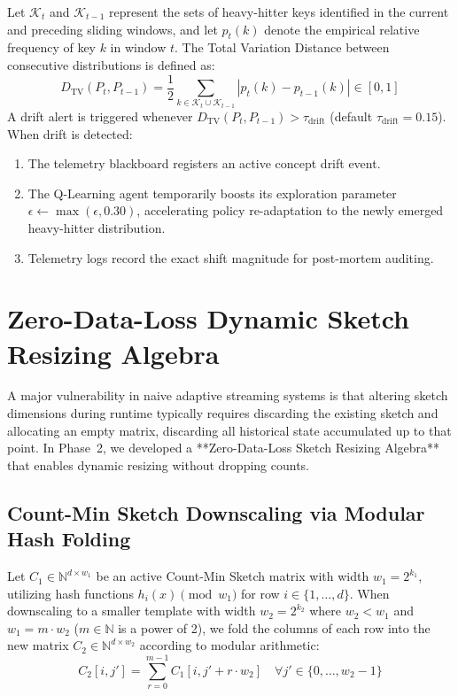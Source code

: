 Let $\mathcal{K}_t$ and $\mathcal{K}_{t-1}$ represent the sets of heavy-hitter keys identified in the current and preceding sliding windows, and let $p_t(k)$ denote the empirical relative frequency of key $k$ in window $t$. The Total Variation Distance between consecutive distributions is defined as:
\begin{equation}
    D_{\text{TV}}(P_t, P_{t-1}) = \frac{1}{2} \sum_{k \in \mathcal{K}_t \cup \mathcal{K}_{t-1}} |p_t(k) - p_{t-1}(k)| \in [0, 1]
    \label{eq:drift_formula}
\end{equation}
A drift alert is triggered whenever $D_{\text{TV}}(P_t, P_{t-1}) > \tau_{\text{drift}}$ (default $\tau_{\text{drift}} = 0.15$). When drift is detected:
\begin{enumerate}
 \item The telemetry blackboard registers an active concept drift event.
 \item The Q-Learning agent temporarily boosts its exploration parameter $\epsilon \leftarrow \max(\epsilon, 0.30)$, accelerating policy re-adaptation to the newly emerged heavy-hitter distribution.
 \item Telemetry logs record the exact shift magnitude for post-mortem auditing.
\end{enumerate}

\section{Zero-Data-Loss Dynamic Sketch Resizing Algebra}

A major vulnerability in naive adaptive streaming systems is that altering sketch dimensions during runtime typically requires discarding the existing sketch and allocating an empty matrix, discarding all historical state accumulated up to that point. In Phase~2, we developed a **Zero-Data-Loss Sketch Resizing Algebra** that enables dynamic resizing without dropping counts.

\subsection{Count-Min Sketch Downscaling via Modular Hash Folding}
Let $C_1 \in \mathbb{N}^{d \times w_1}$ be an active Count-Min Sketch matrix with width $w_1 = 2^{k_1}$, utilizing hash functions $h_i(x) \pmod{w_1}$ for row $i \in \{1, \dots, d\}$. When downscaling to a smaller template with width $w_2 = 2^{k_2}$ where $w_2 < w_1$ and $w_1 = m \cdot w_2$ ($m \in \mathbb{N}$ is a power of 2), we fold the columns of each row into the new matrix $C_2 \in \mathbb{N}^{d \times w_2}$ according to modular arithmetic:
\begin{equation}
    C_2[i, j'] = \sum_{r=0}^{m-1} C_1[i, j' + r \cdot w_2] \quad \forall j' \in \{0, \dots, w_2-1\}
    \label{eq:cms_folding}
\end{equation}

